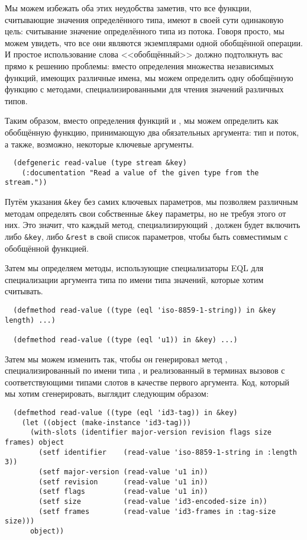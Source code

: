 Мы можем избежать оба этих неудобства заметив, что все функции, считывающие значения
определённого типа, имеют в своей сути одинаковую цель: считывание значение определённого
типа из потока. Говоря просто, мы можем увидеть, что все они являются экземплярами одной
обобщённой операции. И простое использование слова <<обобщённый>> должно подтолкнуть вас
прямо к решению проблемы: вместо определения множества независимых функций, имеющих
различные имена, мы можем определить одну обобщённую функцию  с методами,
специализированными для чтения значений различных типов.

Таким образом, вместо определения функций  и ,
мы можем определить  как обобщённую функцию, принимающую два обязательных
аргумента: тип и поток, а также, возможно, некоторые ключевые аргументы.

\begin{lstlisting}
  (defgeneric read-value (type stream &key)
    (:documentation "Read a value of the given type from the stream."))
\end{lstlisting}

Путём указания \lstinline!&key! без самих ключевых параметров, мы позволяем различным
методам определять свои собственные \lstinline!&key! параметры, но не требуя этого от
них. Это значит, что каждый метод, специализирующий , должен будет
включить либо \lstinline!&key!, либо \lstinline!&rest! в свой список параметров, чтобы
быть совместимым с обобщённой функцией.

Затем мы определяем методы, использующие специализаторы EQL для специализации аргумента
типа по имени типа значений, которые хотим считывать.

\begin{lstlisting}
  (defmethod read-value ((type (eql 'iso-8859-1-string)) in &key length) ...)

  (defmethod read-value ((type (eql 'u1)) in &key) ...)
\end{lstlisting}

Затем мы можем изменить так, чтобы он генерировал метод
, специализированный по имени типа , и реализованный в
терминах вызовов  с соответствующими типами слотов в качестве первого
аргумента. Код, который мы хотим сгенерировать, выглядит следующим образом:

\begin{lstlisting}
  (defmethod read-value ((type (eql 'id3-tag)) in &key)
    (let ((object (make-instance 'id3-tag)))
      (with-slots (identifier major-version revision flags size frames) object
        (setf identifier    (read-value 'iso-8859-1-string in :length 3))
        (setf major-version (read-value 'u1 in))
        (setf revision      (read-value 'u1 in))
        (setf flags         (read-value 'u1 in))
        (setf size          (read-value 'id3-encoded-size in))
        (setf frames        (read-value 'id3-frames in :tag-size size)))
      object))
\end{lstlisting}

